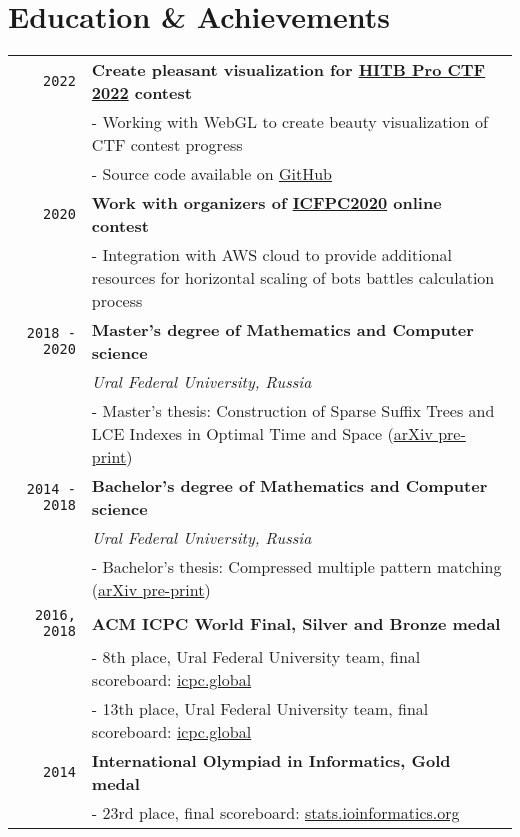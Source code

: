 \documentclass[10pt,a4paper]{article}
\begin{document}
\section{Education \& Achievements}
\vspace{1mm}
\begin{tabular}{r p{14cm}}
	\texttt{2022} & \textbf{Create pleasant visualization for \href{https://proctf.cyberweek.ae/}{HITB Pro CTF 2022} contest}\\
	& \small{- Working with WebGL to create beauty visualization of CTF contest progress}\\
	& \small{- Source code available on \href{https://github.com/sivukhin/cell-visualization}{GitHub}}\\

	\texttt{2020} & \textbf{Work with organizers of \href{https://icfpcontest2020.github.io}{ICFPC2020} online contest}\\
	& \small{- Integration with AWS cloud to provide additional resources for horizontal scaling of bots battles calculation process}\\

    \texttt{2018 - 2020} & \textbf{Master's degree of Mathematics and Computer science} \\
    & \small\textit{Ural Federal University, Russia}\\
    & \small{- Master's thesis: Construction of Sparse Suffix Trees and LCE Indexes in Optimal Time and Space (\href{https://arxiv.org/abs/2105.03782}{arXiv pre-print})} \\

    \texttt{2014 - 2018} & \textbf{Bachelor's degree of Mathematics and Computer science} \\
    & \small\textit{Ural Federal University, Russia}\\
    & \small{- Bachelor's thesis: Compressed multiple pattern matching (\href{https://arxiv.org/abs/1811.01248}{arXiv pre-print})} \\

    \texttt{2016, 2018} & \textbf{ACM ICPC World Final, Silver and Bronze medal}\\
    & \small{- 8th place, Ural Federal University team, final scoreboard: \href{https://icpc.global/community/results-2016}{icpc.global}}\\
    & \small{- 13th place, Ural Federal University team, final scoreboard: \href{https://icpc.global/community/results-2018}{icpc.global}}\\

	\texttt{2014} & \textbf{International Olympiad in Informatics, Gold medal}\\
	& \small{- 23rd place, final scoreboard: \href{http://stats.ioinformatics.org/results/2014}{stats.ioinformatics.org}}
\end{tabular}
\end{document}
